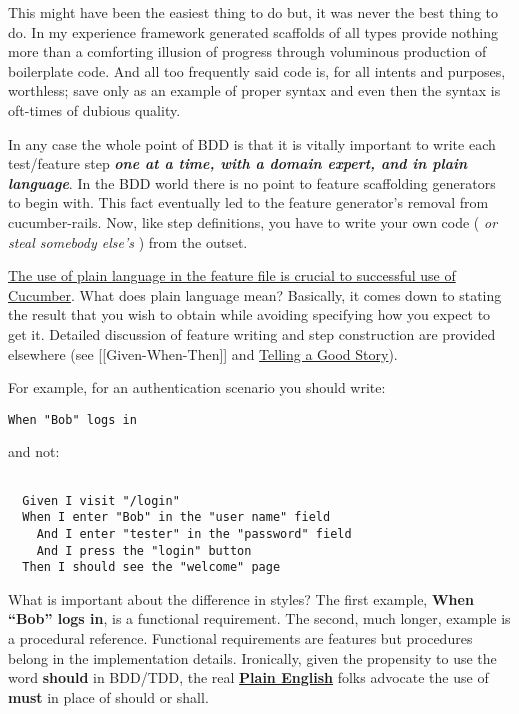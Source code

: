 \documentclass[10pt]{book}
\begin{document}
This might have been the easiest thing to do but, it was never the best thing to do.  In my experience framework generated scaffolds of all types provide nothing more than a comforting illusion of progress through voluminous production of boilerplate code.  And all too frequently said code is, for all intents and purposes, worthless; save only as an example of proper syntax and even then the syntax is oft-times of dubious quality.

In any case the whole point of BDD is that it is vitally important to write each test/feature step \emph{\textbf{one at a time, with a domain expert, and in plain language}}.  In the BDD world there is no point to feature scaffolding generators to begin with.  This fact eventually led to the feature generator's removal from cucumber-rails.  Now, like step definitions, you have to write your own code ( \emph{or steal somebody else's} ) from the outset.

\href{http://elabs.se/blog/15-you-re-cuking-it-wrong}{The use of plain language in the feature file is crucial to successful use of Cucumber}.  What does plain language mean?  Basically, it comes down to stating the result that you wish to obtain while avoiding specifying how you expect to get it.  Detailed discussion of feature writing and step construction are provided elsewhere (see [[Given-When-Then]] and \href{http://blog.josephwilk.net/ruby/telling-a-good-story-rspec-stories-from-the-trenches.html}{Telling a Good Story}).

For example, for an authentication scenario you should write:

\begin{verbatim}
When "Bob" logs in
\end{verbatim}
and not:

\begin{verbatim}

  Given I visit "/login"
  When I enter "Bob" in the "user name" field
    And I enter "tester" in the "password" field
    And I press the "login" button
  Then I should see the "welcome" page

\end{verbatim}


What is important about the difference in styles?  The first example, \textbf{When ``Bob'' logs in},  is a functional requirement.  The second, much longer, example is a procedural reference.  Functional requirements are features but procedures belong in the implementation details.  Ironically, given the propensity to use the word \textbf{should} in BDD/TDD, the real \textbf{\href{http://www.plainlanguage.gov/whatisPL/definitions/Kimble.cfm}{Plain English}} folks advocate the use of \textbf{must} in place of should or shall.
\end{document}
